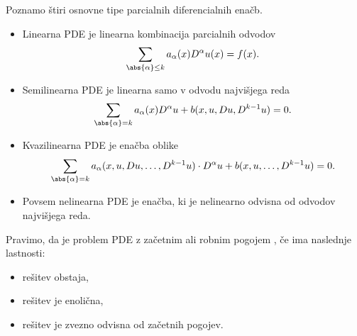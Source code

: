 Poznamo štiri osnovne tipe parcialnih diferencialnih enačb.
\begin{itemize}
\item Linearna PDE je linearna kombinacija parcialnih odvodov
  \[
	\sum_{\abs{\alpha} \le k} a_\alpha(x) D^\alpha u(x) = f(x).
  \]
\item Semilinearna PDE je linearna samo v odvodu najvišjega reda
  \[
	\sum_{\abs{\alpha} = k} a_\alpha(x) D^\alpha u + b(x, u, Du, D^{k-1} u) = 0.
  \]
\item Kvazilinearna PDE je enačba oblike
  \[
	\sum_{\abs{\alpha} = k} a_\alpha(x, u, Du, \ldots, D^{k-1}u) \cdot D^\alpha
	u + b(x, u, \ldots, D^{k-1} u) = 0.
  \]
\item Povsem nelinearna PDE je enačba, ki je nelinearno odvisna od odvodov
  najvišjega reda.
\end{itemize}


\begin{definicija}
  Pravimo, da je problem PDE z začetnim ali robnim pogojem , če ima naslednje lastnosti:
  \begin{itemize}
  \item rešitev obstaja,
  \item rešitev je enolična,
  \item rešitev je zvezno odvisna od začetnih pogojev.
  \end{itemize}
\end{definicija}

